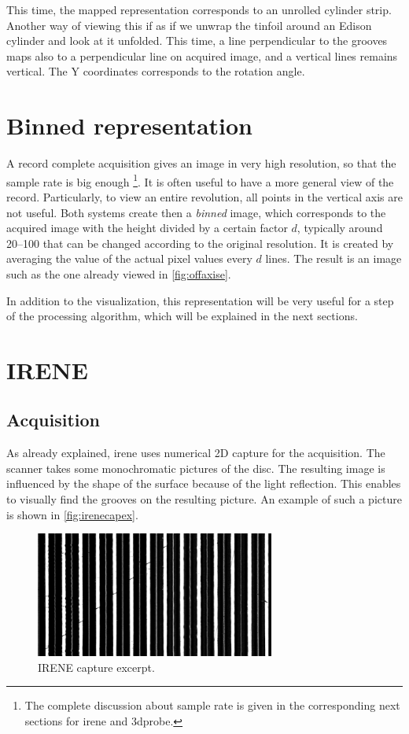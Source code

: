 This time, the mapped representation corresponds to an unrolled cylinder strip. Another way of viewing this if as if we unwrap the tinfoil around an Edison cylinder and look at it unfolded. This time, a line perpendicular to the grooves maps also to a perpendicular line on acquired image, and a vertical lines remains vertical. The Y coordinates corresponds to the rotation angle.

\section{Binned representation}
\label{sec:binrepr}

A record complete acquisition gives an image in very high resolution, so that the sample rate is big enough \footnote{The complete discussion about sample rate is given in the corresponding next sections for \gls{irene} and \gls{3dprobe}.}. It is often useful to have a more general view of the record. Particularly, to view an entire revolution, all points in the vertical axis are not useful. Both systems create then a \emph{binned} image, which corresponds to the acquired image with the height divided by a certain factor $d$, typically around \numrange[range-phrase=--]{20}{100} that can be changed according to the original resolution. It is created by averaging the value of the actual pixel values every $d$ lines. The result is an image such as the one already viewed in \autoref{fig:offaxise}.

In addition to the visualization, this representation will be very useful for a step of the processing algorithm, which will be explained in the next sections.

\section{IRENE}

\subsection{Acquisition}

As already explained, \gls{irene} uses numerical 2D capture for the acquisition. The scanner takes some monochromatic pictures of the disc. The resulting image is influenced by the shape of the surface because of the light reflection. This enables to visually find the grooves on the resulting picture. An example of such a picture is shown in \autoref{fig:irenecapex}.

\begin{figure}[!ht]
\centering
\includegraphics[width=0.7\textwidth]{images/irene-capture-ex}
\caption{IRENE capture excerpt.}
\label{fig:irenecapex}
\end{figure}

